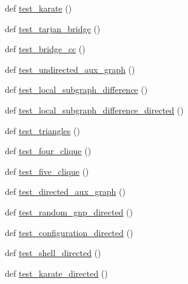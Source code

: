 \begin{DoxyCompactItemize}
\item 
def \hyperlink{namespacenetworkx_1_1algorithms_1_1connectivity_1_1tests_1_1test__edge__kcomponents_a51465a6fff57f95b7c3c763219a1f10f}{test\+\_\+karate} ()
\item 
def \hyperlink{namespacenetworkx_1_1algorithms_1_1connectivity_1_1tests_1_1test__edge__kcomponents_ac0ccdf1274421554ecb088054583bc89}{test\+\_\+tarjan\+\_\+bridge} ()
\item 
def \hyperlink{namespacenetworkx_1_1algorithms_1_1connectivity_1_1tests_1_1test__edge__kcomponents_a086c139b97773f6cc65d9c99dde8a0f0}{test\+\_\+bridge\+\_\+cc} ()
\item 
def \hyperlink{namespacenetworkx_1_1algorithms_1_1connectivity_1_1tests_1_1test__edge__kcomponents_a7ad64f04661994694aa1c1ccc1761d60}{test\+\_\+undirected\+\_\+aux\+\_\+graph} ()
\item 
def \hyperlink{namespacenetworkx_1_1algorithms_1_1connectivity_1_1tests_1_1test__edge__kcomponents_a05abfc1dd04fad849dcd953b78fd08af}{test\+\_\+local\+\_\+subgraph\+\_\+difference} ()
\item 
def \hyperlink{namespacenetworkx_1_1algorithms_1_1connectivity_1_1tests_1_1test__edge__kcomponents_a366003d454811c4692aa403461b2de27}{test\+\_\+local\+\_\+subgraph\+\_\+difference\+\_\+directed} ()
\item 
def \hyperlink{namespacenetworkx_1_1algorithms_1_1connectivity_1_1tests_1_1test__edge__kcomponents_ae4b1eff7d415e7ee009aea9bb349a783}{test\+\_\+triangles} ()
\item 
def \hyperlink{namespacenetworkx_1_1algorithms_1_1connectivity_1_1tests_1_1test__edge__kcomponents_a9689b9be28c4f5d55e6fd13beb2f82ea}{test\+\_\+four\+\_\+clique} ()
\item 
def \hyperlink{namespacenetworkx_1_1algorithms_1_1connectivity_1_1tests_1_1test__edge__kcomponents_aaf95f052dc99985ca4472c70fdd7fd12}{test\+\_\+five\+\_\+clique} ()
\item 
def \hyperlink{namespacenetworkx_1_1algorithms_1_1connectivity_1_1tests_1_1test__edge__kcomponents_a561de415c81369c12bbc0dd7058693b6}{test\+\_\+directed\+\_\+aux\+\_\+graph} ()
\item 
def \hyperlink{namespacenetworkx_1_1algorithms_1_1connectivity_1_1tests_1_1test__edge__kcomponents_a79f2abb4145c4fb40c5aedf4ea9af265}{test\+\_\+random\+\_\+gnp\+\_\+directed} ()
\item 
def \hyperlink{namespacenetworkx_1_1algorithms_1_1connectivity_1_1tests_1_1test__edge__kcomponents_a680360e6130edae563534ec115a7c555}{test\+\_\+configuration\+\_\+directed} ()
\item 
def \hyperlink{namespacenetworkx_1_1algorithms_1_1connectivity_1_1tests_1_1test__edge__kcomponents_a0163058ed3aec2ee3ec0c56414874465}{test\+\_\+shell\+\_\+directed} ()
\item 
def \hyperlink{namespacenetworkx_1_1algorithms_1_1connectivity_1_1tests_1_1test__edge__kcomponents_afaed8e3e7ee002592731f3500946b033}{test\+\_\+karate\+\_\+directed} ()
\end{DoxyCompactItemize}


